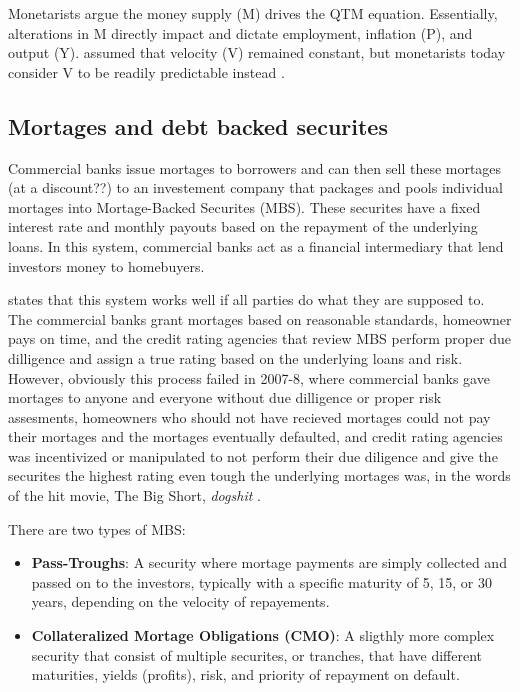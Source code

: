Monetarists argue the money supply (M) drives the QTM equation. Essentially, alterations in M directly impact and dictate employment, inflation (P), and output (Y). \textcite{friedman2008monetary} assumed that velocity (V) remained constant, but monetarists today consider V to be readily predictable instead \cite{monetarismInvestopedia}. 


\subsection{Mortages and debt backed securites}

Commercial banks issue mortages to borrowers and can then sell these mortages (at a discount??) to an investement company that packages and pools individual mortages into Mortage-Backed Securites (MBS). These securites have a fixed interest rate and monthly payouts based on the repayment of the underlying loans. In this system, commercial banks act as a financial intermediary that lend investors money to homebuyers. 

\textcite{MBSInvestopedia} states that this system works well if all parties do what they are supposed to. The commercial banks grant mortages based on reasonable standards, homeowner pays on time, and the credit rating agencies that review MBS perform proper due dilligence and assign a true rating based on the underlying loans and risk. However, obviously this process failed in 2007-8, where commercial banks gave mortages to anyone and everyone without due dilligence or proper risk assesments, homeowners who should not have recieved mortages could not pay their mortages and the mortages eventually defaulted, and credit rating agencies was incentivized or manipulated to not perform their due diligence and give the securites the highest rating even tough the underlying mortages was, in the words of the hit movie, The Big Short, \textit{dogshit} \cite{thebigshort}.

There are two types of MBS:
\begin{itemize}
    \item \textbf{Pass-Troughs}: A security where mortage payments are simply collected and passed on to the investors, typically with a specific maturity of 5, 15, or 30 years, depending on the velocity of repayements.
    \item  \textbf{Collateralized Mortage Obligations (CMO)}: A sligthly more complex security that consist of multiple securites, or tranches, that have  different maturities, yields (profits), risk, and priority of repayment on default.
\end{itemize}

